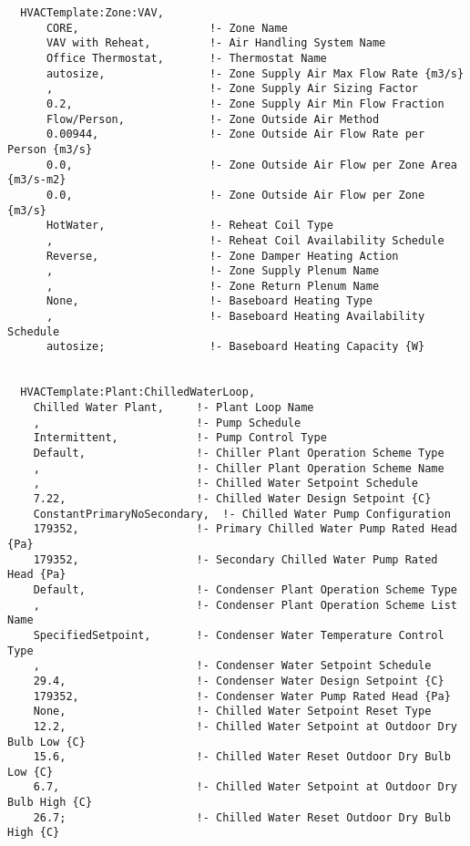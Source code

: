 \begin{lstlisting}
  HVACTemplate:Zone:VAV,
      CORE,                    !- Zone Name
      VAV with Reheat,         !- Air Handling System Name
      Office Thermostat,       !- Thermostat Name
      autosize,                !- Zone Supply Air Max Flow Rate {m3/s}
      ,                        !- Zone Supply Air Sizing Factor
      0.2,                     !- Zone Supply Air Min Flow Fraction
      Flow/Person,             !- Zone Outside Air Method
      0.00944,                 !- Zone Outside Air Flow Rate per Person {m3/s}
      0.0,                     !- Zone Outside Air Flow per Zone Area {m3/s-m2}
      0.0,                     !- Zone Outside Air Flow per Zone {m3/s}
      HotWater,                !- Reheat Coil Type
      ,                        !- Reheat Coil Availability Schedule
      Reverse,                 !- Zone Damper Heating Action
      ,                        !- Zone Supply Plenum Name
      ,                        !- Zone Return Plenum Name
      None,                    !- Baseboard Heating Type
      ,                        !- Baseboard Heating Availability Schedule
      autosize;                !- Baseboard Heating Capacity {W}


  HVACTemplate:Plant:ChilledWaterLoop,
    Chilled Water Plant,     !- Plant Loop Name
    ,                        !- Pump Schedule
    Intermittent,            !- Pump Control Type
    Default,                 !- Chiller Plant Operation Scheme Type
    ,                        !- Chiller Plant Operation Scheme Name
    ,                        !- Chilled Water Setpoint Schedule
    7.22,                    !- Chilled Water Design Setpoint {C}
    ConstantPrimaryNoSecondary,  !- Chilled Water Pump Configuration
    179352,                  !- Primary Chilled Water Pump Rated Head {Pa}
    179352,                  !- Secondary Chilled Water Pump Rated Head {Pa}
    Default,                 !- Condenser Plant Operation Scheme Type
    ,                        !- Condenser Plant Operation Scheme List Name
    SpecifiedSetpoint,       !- Condenser Water Temperature Control Type
    ,                        !- Condenser Water Setpoint Schedule
    29.4,                    !- Condenser Water Design Setpoint {C}
    179352,                  !- Condenser Water Pump Rated Head {Pa}
    None,                    !- Chilled Water Setpoint Reset Type
    12.2,                    !- Chilled Water Setpoint at Outdoor Dry Bulb Low {C}
    15.6,                    !- Chilled Water Reset Outdoor Dry Bulb Low {C}
    6.7,                     !- Chilled Water Setpoint at Outdoor Dry Bulb High {C}
    26.7;                    !- Chilled Water Reset Outdoor Dry Bulb High {C}



\end{lstlisting}
